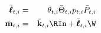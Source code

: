 \begin{eqnarray}
      \bar{\pmb{\ell}}_{t,i} & = & \theta_{t,i}\bar{\Theta}_{t,i}{p}_{t,i}\bar{{P}}_{t,i} %
\\    \bar{\mathbf{m}}_{t,i} & = & \bar{\mathbf{k}}_{t,i} \RIn + \bar{\pmb{\ell}}_{t,i} \W
\end{eqnarray}
